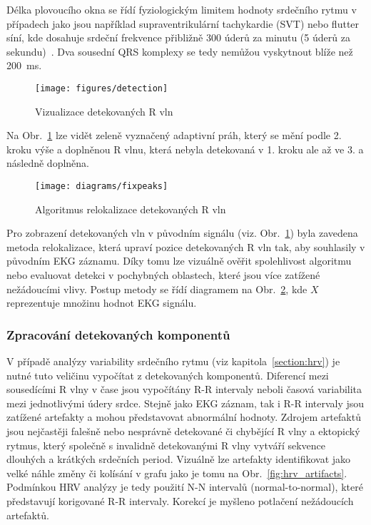 Délka plovoucího okna se řídí fyziologickým limitem hodnoty srdečního rytmu v
případech jako jsou například supraventrikulární tachykardie (SVT) nebo flutter
síní, kde dosahuje srdeční frekvence přibližně 300 úderů za minutu (5 úderů za
sekundu)~\cite{Haberl2012,Goldberger2017}. Dva sousední QRS komplexy se tedy
nemůžou vyskytnout blíže než 200~\si\ms.

\begin{figure}[h]
    \begin{center}
        \texttt{[image: figures/detection]}
        \caption{Vizualizace detekovaných R vln}
        \label{fig:detection}
    \end{center}
\end{figure}

Na Obr.~\ref{fig:detection} lze vidět zeleně vyznačený
adaptivní práh, který se mění podle 2. kroku výše a doplněnou R vlnu, která
nebyla detekovaná v 1. kroku ale až ve 3. a následně doplněna.
\begin{figure}[h]
    \begin{center}
        \texttt{[image: diagrams/fixpeaks]}
        \caption{Algoritmus relokalizace detekovaných R vln}
        \label{fig:fixpeaks}
    \end{center}
\end{figure}
Pro zobrazení detekovaných vln v původním signálu (viz. Obr.~\ref{fig:detection})
byla zavedena metoda relokalizace, která upraví pozice
detekovaných R vln tak, aby souhlasily v původním EKG záznamu. Díky tomu lze
vizuálně ověřit spolehlivost algoritmu nebo evaluovat detekci v pochybných
oblastech, které jsou více zatížené nežádoucími vlivy. Postup metody se řídí
diagramem na Obr.~\ref{fig:fixpeaks}, kde $X$ reprezentuje množinu hodnot EKG
signálu.

\subsubsection{Zpracování detekovaných komponentů}
\label{section:components_processing}
V případě analýzy variability srdečního rytmu (viz kapitola~\ref{section:hrv})
je nutné tuto veličinu vypočítat z detekovaných komponentů. Diferencí mezi
sousedícími R vlny v čase jsou vypočítány R-R intervaly neboli časová
variabilita mezi jednotlivými údery srdce. Stejně jako EKG záznam, tak i R-R
intervaly jsou zatížené artefakty a mohou představovat abnormální hodnoty.
Zdrojem artefaktů jsou nejčastěji falešně nebo nesprávně detekované či chybějící
R vlny a ektopický rytmus, který společně s invalidně detekovanými R vlny
vytváří sekvence dlouhých a krátkých srdečních period. Vizuálně lze artefakty
identifikovat jako velké náhle změny či kolísání v grafu jako je tomu na
Obr.~\ref{fig:hrv_artifacts}. Podmínkou HRV analýzy je tedy použití N-N
intervalů (normal-to-normal), které představují korigované R-R intervaly.
Korekcí je myšleno potlačení nežádoucích artefaktů.

